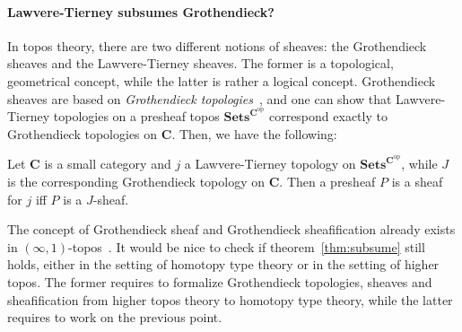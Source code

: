 \paragraph*{Lawvere-Tierney subsumes Grothendieck?}
In topos theory, there are two different notions of sheaves: the
Grothendieck sheaves and the Lawvere-Tierney sheaves.
The former is a topological, geometrical concept, while the latter is
rather a logical concept.
Grothendieck sheaves are based on {\em Grothendieck
  topologies}~\cite[Chapter III]{maclanemoerdijk}, and one can show
that Lawvere-Tierney topologies on a presheaf topos
$\mathbf{Sets}^{\mathbf{C}^{\mathrm{op}}}$ correspond exactly to
Grothendieck topologies on $\mathbf{C}$. Then, we have the following:
\begin{thm}
  \label{thm:subsume}
  Let $\mathbf{C}$ is a small category and $j$ a Lawvere-Tierney
  topology on $\mathbf{Sets}^{\mathbf{C}^{\mathrm{op}}}$, while $J$ is
  the corresponding Grothendieck topology on $\mathbf{C}$. Then a
  presheaf $P$ is a sheaf for $j$ iff $P$ is a $J$-sheaf.
\end{thm}
The concept of Grothendieck sheaf and Grothendieck sheafification
already exists in $(\infty,1)$-topos~\cite[Section 6.2.2]{lurie}. 
It would be nice to check if theorem~\ref{thm:subsume} still holds,
either in the setting of homotopy type theory or in
the setting of higher topos. The former requires to formalize
Grothendieck topologies, sheaves and sheafification from higher topos
theory to homotopy type theory, while the latter requires to work on
the previous point.






